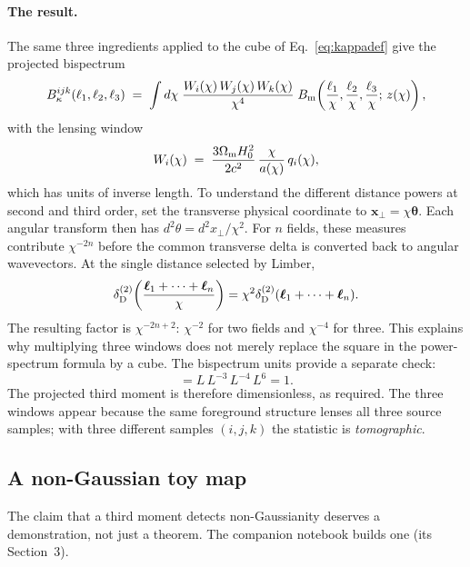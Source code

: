 \documentclass[11pt]{article}
\newcommand{\btheta}{\boldsymbol{\theta}}
\newcommand{\bell}{\boldsymbol{\ell}}
\numberwithin{equation}{section}
\begin{document}
\paragraph{The result.}
The same three ingredients applied to the cube of
Eq.~\eqref{eq:kappadef} give the projected
bispectrum~\cite{GomesTATT}
\begin{equation}
  B^{ijk}_\kappa(\ell_1,\ell_2,\ell_3)
  \;=\;
  \int d\chi\;
  \frac{W_i(\chi)\, W_j(\chi)\, W_k(\chi)}{\chi^4}\;
  B_{\rm m}\!\left(\frac{\ell_1}{\chi}, \frac{\ell_2}{\chi},
  \frac{\ell_3}{\chi};\, z(\chi)\right),
  \label{eq:limber}
\end{equation}
with the lensing window
\begin{equation}
  W_i(\chi) \;=\;
  \frac{3\Omega_{\rm m} H_0^2}{2 c^2}\,
  \frac{\chi}{a(\chi)}\, q_i(\chi) ,
  \label{eq:window}
\end{equation}
which has units of inverse length. To understand the different distance
powers at second and third order, set the transverse physical coordinate
to $\boldsymbol{x}_\perp=\chi\btheta$. Each angular transform then has
$d^2\theta=d^2x_\perp/\chi^2$. For $n$ fields, these measures contribute
$\chi^{-2n}$ before the common transverse delta is converted back to
angular wavevectors. At the single distance selected by Limber,
\begin{equation}
 \delta_{\rm D}^{(2)}\!\left(\frac{\bell_1+\cdots+\bell_n}{\chi}\right)
 =\chi^2\delta_{\rm D}^{(2)}(\bell_1+\cdots+\bell_n).
\end{equation}
The resulting factor is $\chi^{-2n+2}$: $\chi^{-2}$ for two fields
and $\chi^{-4}$ for three. This explains why multiplying three windows
does not merely replace the square in the power-spectrum formula by a
cube. The bispectrum units provide a separate check:
\begin{equation}
 [d\chi\,W_iW_jW_k\,\chi^{-4}B_{\rm m}]
 =L\,L^{-3}\,L^{-4}\,L^6=1.
\end{equation}
The projected third moment is therefore dimensionless, as required.  The three
windows appear because the same foreground structure lenses all
three source samples; with three different samples $(i,j,k)$ the
statistic is \emph{tomographic}.

\subsection{A non-Gaussian toy map}
\label{sec:toythird}

The claim that a third moment detects non-Gaussianity deserves a
demonstration, not just a theorem.  The companion notebook builds
one (its Section~3).
\end{document}
